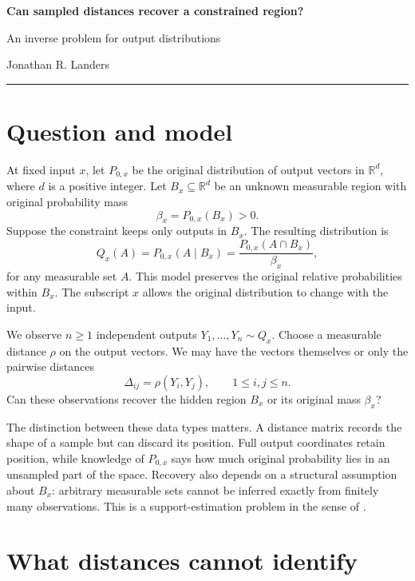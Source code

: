 \documentclass[10pt,letterpaper]{article}
\theoremstyle{typed}
\begin{document}
\thispagestyle{fancy}

{\Large\bfseries Can sampled distances recover a constrained region?}\par
{\small An inverse problem for output distributions}\par
{\small Jonathan R. Landers}\par
\vspace{0.25em}\noindent\rule{\textwidth}{0.5pt}

\section{Question and model}

At fixed input $x$, let $P_{0,x}$ be the original distribution of output vectors in $\mathbb{R}^d$, where $d$ is a positive integer. Let $B_x\subseteq\mathbb{R}^d$ be an unknown measurable region with original probability mass
\[
  \beta_x=P_{0,x}(B_x)>0.
\]
Suppose the constraint keeps only outputs in $B_x$. The resulting distribution is
\begin{equation}
  Q_x(A)=P_{0,x}(A\mid B_x)
  =\frac{P_{0,x}(A\cap B_x)}{\beta_x},
  \label{eq:restriction}
\end{equation}
for any measurable set $A$. This model preserves the original relative probabilities within $B_x$. The subscript $x$ allows the original distribution to change with the input.

We observe $n\geq1$ independent outputs $Y_1,\ldots,Y_n\sim Q_x$. Choose a measurable distance $\rho$ on the output vectors. We may have the vectors themselves or only the pairwise distances
\[
  \Delta_{ij}=\rho(Y_i,Y_j),\qquad 1\leq i,j\leq n.
\]
Can these observations recover the hidden region $B_x$ or its original mass $\beta_x$?

The distinction between these data types matters. A distance matrix records the shape of a sample but can discard its position. Full output coordinates retain position, while knowledge of $P_{0,x}$ says how much original probability lies in an unsampled part of the space. Recovery also depends on a structural assumption about $B_x$: arbitrary measurable sets cannot be inferred exactly from finitely many observations. This is a support-estimation problem in the sense of \cite{devroye1980}.

\section{What distances cannot identify}
\end{document}
